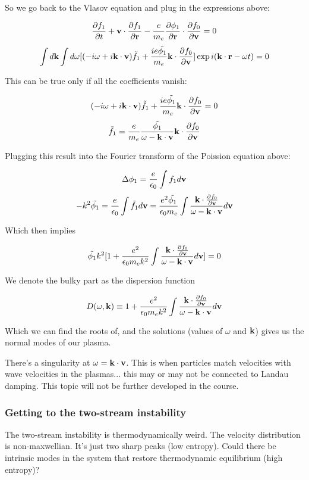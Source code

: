 So we go back to the Vlasov equation and plug in the expressions above:

\[\frac{\partial f_1}{\partial t} + \mathbf{v} \cdot \frac{\partial f_1}{\partial \mathbf{r}} - \frac{e}{m_e}\frac{\partial \phi_1}{\partial \mathbf{r}} \cdot \frac{\partial f_0}{\partial \mathbf{v}} = 0\]
\[\int d\mathbf{k} \int d\omega [(-i\omega + i \mathbf{k} \cdot \mathbf{v}) \tilde{f_1} + \frac{i e \tilde{\phi_1}}{m_e} \mathbf{k} \cdot \frac{\partial f_0}{\partial \mathbf{v}}]\exp{i(\ensuremath{\mathbf{k}} \cdot \ensuremath{\mathbf{r}} - \omega t)} = 0 \]

This can be true only if all the coefficients vanish:

\[ (-i\omega + i \mathbf{k} \cdot \mathbf{v}) \tilde{f_1} + \frac{i e \tilde{\phi_1}}{m_e} \mathbf{k} \cdot \frac{\partial f_0}{\partial \mathbf{v}} = 0 \]
\[ \tilde{f_1} = \frac{e}{m_e} \frac{\tilde{\phi_1}}{\omega - \mathbf{k} \cdot \mathbf{v}} \mathbf{k} \cdot \frac{\partial f_0}{\partial \mathbf{v}} \]

Plugging this result into the Fourier transform of the Poission equation above:

\[ \Delta \phi_1 = \frac{e}{\epsilon_0} \int f_1 d\mathbf{v} \]
\[ -k^2 \tilde{\phi_1} = \frac{e}{\epsilon_0} \int \tilde{f_1} d\mathbf{v} =\frac{e^2 \tilde{\phi_1}}{\epsilon_0 m_e} \int \frac{\mathbf{k} \cdot \frac{\partial f_0}{\partial \mathbf{v}}}{\omega - \mathbf{k} \cdot \mathbf{v}} d\mathbf{v} \]

Which then implies

\[ \tilde{\phi_1} k^2 [ 1+ \frac{e^2}{\epsilon_0 m_e k^2} \int \frac{\mathbf{k} \cdot \frac{\partial f_0}{\partial \mathbf{v}}}{\omega - \mathbf{k} \cdot \mathbf{v}} d\mathbf{v} ] =0 \]

We denote the bulky part as the dispersion function

\[ D(\omega, \mathbf{k}) \equiv 1+ \frac{e^2}{\epsilon_0 m_e k^2} \int \frac{\mathbf{k} \cdot \frac{\partial f_0}{\partial \mathbf{v}}}{\omega - \mathbf{k} \cdot \mathbf{v}} d\mathbf{v} \]

Which we can find the roots of, and the solutions (values of $\omega$ and $\mathbf{k}$) gives us the normal modes of our plasma.

There's a singularity at $\omega = \mathbf{k} \cdot \mathbf{v}$. This is when particles match velocities with wave velocities in the plasmas... this may or may not be connected to Landau damping. This topic will not be further developed in the course.

\subsubsection{Getting to the two-stream instability}

The two-stream instability is thermodynamically weird. The velocity distribution is non-maxwellian.
It's just two sharp peaks (low entropy). Could there be intrinsic modes in the system that restore thermodynamic equilibrium (high entropy)?

